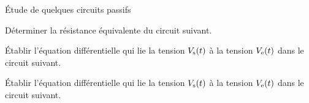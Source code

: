 \begin{exo}[MPSI]{Étude de quelques circuits passifs}

\begin{quest}

\item Déterminer la résistance équivalente du circuit suivant.

\begin{center}

\end{center}


\item Établir l'équation différentielle qui lie la tension $V_{\rm s}(t)$ à la tension $V_{\rm e}(t)$ dans le circuit suivant.
%
\begin{center}

\end{center}

\item Établir l'équation différentielle qui lie la tension $V_{\rm s}(t)$ à la tension $V_{\rm e}(t)$ dans le circuit suivant.

\begin{center}

\end{center}


\end{quest}
\end{exo}


